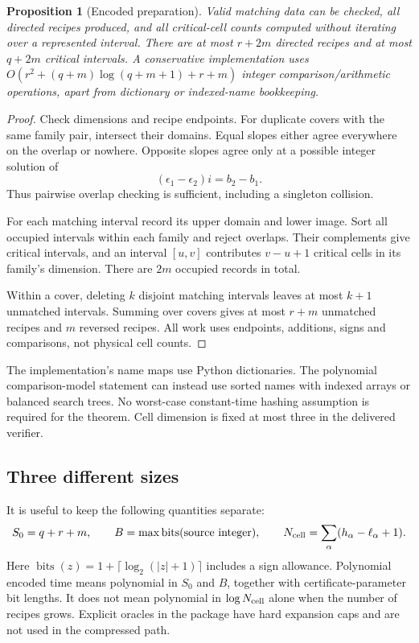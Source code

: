 \documentclass[11pt,letterpaper]{article}
\newtheorem{proposition}[theorem]{Proposition}
\theoremstyle{definition}
\theoremstyle{remark}\newtheorem{remark}[theorem]{Remark}
\newcommand{\bits}{\operatorname{bits}}
\begin{document}
\begin{proposition}[Encoded preparation]
\label{prop:prepare}
Valid matching data can be checked, all directed recipes produced, and all critical-cell counts computed without iterating over a represented interval. There are at most $r+2m$ directed recipes and at most $q+2m$ critical intervals. A conservative implementation uses $O(r^2+(q+m)\log(q+m+1)+r+m)$ integer comparison/arithmetic operations, apart from dictionary or indexed-name bookkeeping.
\end{proposition}
\begin{proof}
Check dimensions and recipe endpoints. For duplicate covers with the same family pair, intersect their domains. Equal slopes either agree everywhere on the overlap or nowhere. Opposite slopes agree only at a possible integer solution of
\[
       (\epsilon_1-\epsilon_2)i=b_2-b_1.
\]
Thus pairwise overlap checking is sufficient, including a singleton collision.

For each matching interval record its upper domain and lower image. Sort all occupied intervals within each family and reject overlaps. Their complements give critical intervals, and an interval $[u,v]$ contributes $v-u+1$ critical cells in its family's dimension. There are $2m$ occupied records in total.

Within a cover, deleting $k$ disjoint matching intervals leaves at most $k+1$ unmatched intervals. Summing over covers gives at most $r+m$ unmatched recipes and $m$ reversed recipes. All work uses endpoints, additions, signs and comparisons, not physical cell counts.
\end{proof}

The implementation's name maps use Python dictionaries. The polynomial comparison-model statement can instead use sorted names with indexed arrays or balanced search trees. No worst-case constant-time hashing assumption is required for the theorem. Cell dimension is fixed at most three in the delivered verifier.

\subsection{Three different sizes}

It is useful to keep the following quantities separate:
\[
 S_0=q+r+m,\qquad
 B=\max\bits(\text{source integer}),\qquad
 N_{\rm cell}=\sum_\alpha(h_\alpha-\ell_\alpha+1).
\]
Here $\bits(z)=1+\lceil\log_2(|z|+1)\rceil$ includes a sign allowance. Polynomial encoded time means polynomial in $S_0$ and $B$, together with certificate-parameter bit lengths. It does not mean polynomial in $\log N_{\rm cell}$ alone when the number of recipes grows. Explicit oracles in the package have hard expansion caps and are not used in the compressed path.
\end{document}

